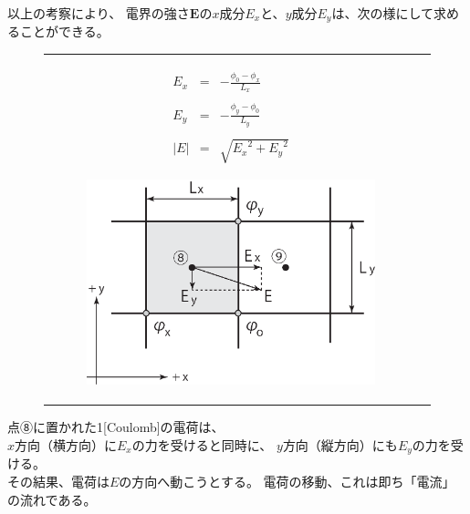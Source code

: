 \documentclass[uplatex,a4paper,11pt,oneside,openany]{jsbook}
\begin{document}
以上の考察により、
電界の強さ$\bm{E}$の$x$成分$E_x$と、$y$成分$E_y$は、次の様にして求めることができる。
\begin{figure}[H]
  \centering
  \begin{tabular}{lr}
      \begin{minipage}[t]{0.4\hsize}
        \begin{eqnarray*}
          E_x &=& -\frac{\phi_0-\phi_x}{L_x} \\ \\
          E_y &=& -\frac{\phi_y-\phi_0}{L_y} \\ \\
          \left| E \right| &=& \sqrt{{E_x}^2 + {E_y}^2}
        \end{eqnarray*}
      \end{minipage}
      \begin{minipage}[t]{0.5\hsize}
        \begin{figure}[H]
  \includegraphics[clip,scale=0.45]{./figure/field.eps}
        \end{figure}
      \end{minipage}
    \end{tabular}
\end{figure}%
点⑧に置かれた1[Coulomb]の電荷は、\\
$x$方向（横方向）に$E_x$の力を受けると同時に、
$y$方向（縦方向）にも$E_y$の力を受ける。\\
その結果、電荷は$E$の方向へ動こうとする。
電荷の移動、これは即ち「電流」の流れである。\\
\end{document}
